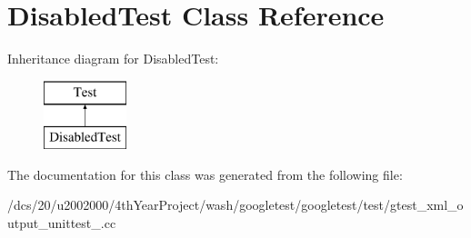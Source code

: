 \hypertarget{classDisabledTest}{}\section{Disabled\+Test Class Reference}
\label{classDisabledTest}
Inheritance diagram for Disabled\+Test\+:\begin{figure}[H]
\begin{center}
\leavevmode
\includegraphics[height=2.000000cm]{classDisabledTest}
\end{center}
\end{figure}


The documentation for this class was generated from the following file\+:\begin{DoxyCompactItemize}
\item 
/dcs/20/u2002000/4th\+Year\+Project/wash/googletest/googletest/test/gtest\+\_\+xml\+\_\+output\+\_\+unittest\+\_\+.\+cc\end{DoxyCompactItemize}
